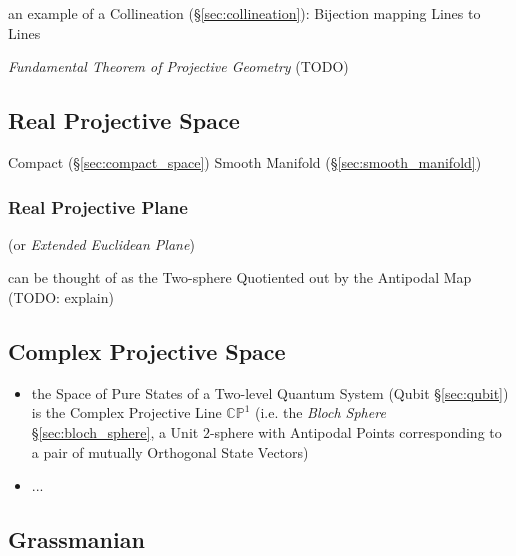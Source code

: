 an example of a Collineation (\S\ref{sec:collineation}): Bijection mapping Lines
to Lines

\emph{Fundamental Theorem of Projective Geometry} (TODO)



\subsection{Real Projective Space}\label{sec:real_projective_space}

Compact (\S\ref{sec:compact_space}) Smooth Manifold
(\S\ref{sec:smooth_manifold})



\subsubsection{Real Projective Plane}\label{sec:real_projective_plane}

(or \emph{Extended Euclidean Plane})

can be thought of as the Two-sphere Quotiented out by the Antipodal Map (TODO:
explain)



\subsection{Complex Projective Space}\label{sec:complex_projective_space}

\begin{itemize}
  \item the Space of Pure States of a Two-level Quantum System (Qubit
    \S\ref{sec:qubit}) is the Complex Projective Line $\mathbb{CP}^1$ (i.e. the
    \emph{Bloch Sphere} \S\ref{sec:bloch_sphere}, a Unit $2$-sphere with
    Antipodal Points corresponding to a pair of mutually Orthogonal State
    Vectors)
  \item ...
\end{itemize}



\subsection{Grassmanian}\label{sec:grassmanian}

